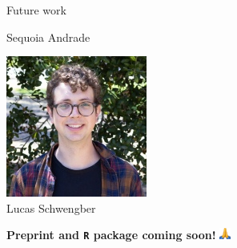 \begin{frame}{Future work}
{\begin{minipage}[t]{0.24\textwidth}
    Sequoia Andrade
\end{minipage}
\begin{minipage}[t]{0.24\textwidth}
    \centering
\includegraphics[height=0.9\textwidth]{static_figures/lucas.jpg}\\
Lucas Schwengber
\end{minipage}

}

\hrulefill

\textbf{Preprint and \texttt{R} package coming soon!}
\includegraphics[height=1em]{static_figures/folded-hands.png}


\end{frame}



